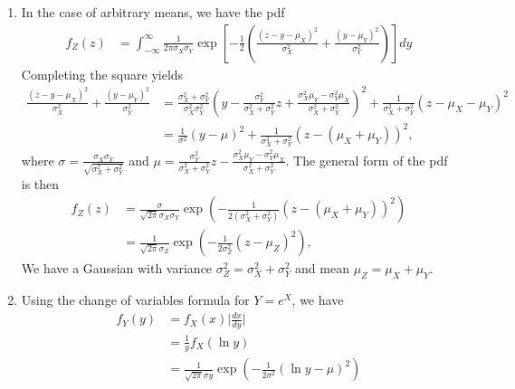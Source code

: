 \documentclass[submit]{harvardml}
\begin{document}
\begin{enumerate}[label=(\alph*)]
	\item In the case of arbitrary means, we have the pdf
	\begin{align*}
	f_Z(z) &=
	\int_{-\infty}^{\infty} \frac{1}{2\pi\sigma_X\sigma_Y} \exp\left[ -\frac{1}{2}\left(\frac{(z - y - \mu_X)^2}{\sigma_X^2} + \frac{(y - \mu_Y)^2}{\sigma_Y^2}\right) \right] dy
	\end{align*}
	Completing the square yields
	\begin{align*}
	\frac{(z - y - \mu_X)^2}{\sigma_X^2} + \frac{(y - \mu_Y)^2}{\sigma_Y^2}
	&= \frac{\sigma_X^2 + \sigma_Y^2}{\sigma_X^2\sigma_Y^2} \left(y - \frac{\sigma_Y^2}{\sigma_X^2 + \sigma_Y^2} z + \frac{\sigma_X^2\mu_Y - \sigma_Y^2\mu_X}{\sigma_X^2 + \sigma_Y^2}\right)^2 + \frac{1}{\sigma_X^2 + \sigma_Y^2} (z - \mu_X - \mu_Y)^2 \\
	&= \frac{1}{\sigma^2} (y - \mu)^2 + \frac{1}{\sigma_X^2 + \sigma_Y^2} (z - (\mu_X + \mu_Y))^2,
	\end{align*}
	where $\sigma = \frac{\sigma_X\sigma_Y}{\sqrt{\sigma_X^2 + \sigma_Y^2}}$ and $\mu = \frac{\sigma_Y^2}{\sigma_X^2 + \sigma_Y^2} z - \frac{\sigma_X^2\mu_Y - \sigma_Y^2\mu_X}{\sigma_X^2 + \sigma_Y^2}$. The general form of the pdf is then
	\begin{align*}
	f_Z(z) &= 
	\frac{\sigma}{\sqrt{2\pi}\sigma_X\sigma_Y} \exp\left(-\frac{1}{2(\sigma_X^2 + \sigma_Y^2)} (z - (\mu_X + \mu_Y))^2\right) \\
	&= \frac{1}{\sqrt{2\pi}\sigma_Z} \exp\left(-\frac{1}{2\sigma_Z^2} (z - \mu_Z)^2\right),
	\end{align*}
	We have a Gaussian with variance $\sigma_Z^2 = \sigma_X^2 + \sigma_Y^2$ and mean $\mu_Z = \mu_X + \mu_Y$.
	
	\item Using the change of variables formula for $Y = e^X$, we have
	\begin{align*}
	f_Y(y) &= f_X(x)\lvert\frac{dx}{dy}\rvert \\
	&= \frac{1}{y} f_X(\ln y) \\
	&= \frac{1}{\sqrt{2\pi}\sigma y} \exp\left( -\frac{1}{2\sigma^2}(\ln y - \mu)^2 \right) \\
	\end{align*}
	
\end{enumerate}
\end{document}
